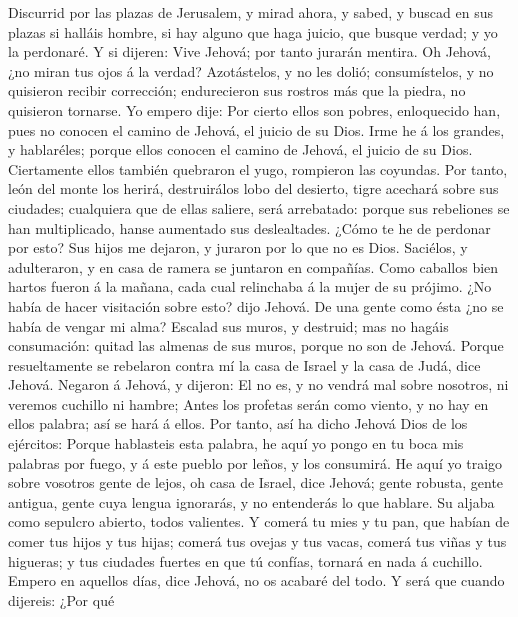  Discurrid por las plazas de Jerusalem, y mirad ahora, y
sabed, y buscad en sus plazas si halláis hombre, si hay alguno que haga
juicio, que busque verdad; y yo la perdonaré.  Y si dijeren:
Vive Jehová; por tanto jurarán mentira.  Oh Jehová, ¿no
miran tus ojos á la verdad? Azotástelos, y no les dolió; consumístelos,
y no quisieron recibir corrección; endurecieron sus rostros más que la
piedra, no quisieron tornarse.  Yo empero dije: Por cierto
ellos son pobres, enloquecido han, pues no conocen el camino de Jehová,
el juicio de su Dios.  Irme he á los grandes, y hablaréles;
porque ellos conocen el camino de Jehová, el juicio de su Dios.
Ciertamente ellos también quebraron el yugo, rompieron las coyundas.
 Por tanto, león del monte los herirá, destruirálos lobo del
desierto, tigre acechará sobre sus ciudades; cualquiera que de ellas
saliere, será arrebatado: porque sus rebeliones se han multiplicado,
hanse aumentado sus deslealtades.  ¿Cómo te he de perdonar
por esto? Sus hijos me dejaron, y juraron por lo que no es Dios.
Saciélos, y adulteraron, y en casa de ramera se juntaron en compañías.
 Como caballos bien hartos fueron á la mañana, cada cual
relinchaba á la mujer de su prójimo.  ¿No había de hacer
visitación sobre esto? dijo Jehová. De una gente como ésta ¿no se había
de vengar mi alma?  Escalad sus muros, y destruid; mas no
hagáis consumación: quitad las almenas de sus muros, porque no son de
Jehová.  Porque resueltamente se rebelaron contra mí la
casa de Israel y la casa de Judá, dice Jehová.  Negaron á
Jehová, y dijeron: El no es, y no vendrá mal sobre nosotros, ni veremos
cuchillo ni hambre;  Antes los profetas serán como viento,
y no hay en ellos palabra; así se hará á ellos.  Por tanto,
así ha dicho Jehová Dios de los ejércitos: Porque hablasteis esta
palabra, he aquí yo pongo en tu boca mis palabras por fuego, y á este
pueblo por leños, y los consumirá.  He aquí yo traigo sobre
vosotros gente de lejos, oh casa de Israel, dice Jehová; gente robusta,
gente antigua, gente cuya lengua ignorarás, y no entenderás lo que
hablare.  Su aljaba como sepulcro abierto, todos valientes.
 Y comerá tu mies y tu pan, que habían de comer tus hijos y
tus hijas; comerá tus ovejas y tus vacas, comerá tus viñas y tus
higueras; y tus ciudades fuertes en que tú confías, tornará en nada á
cuchillo.  Empero en aquellos días, dice Jehová, no os
acabaré del todo.  Y será que cuando dijereis: ¿Por qué

